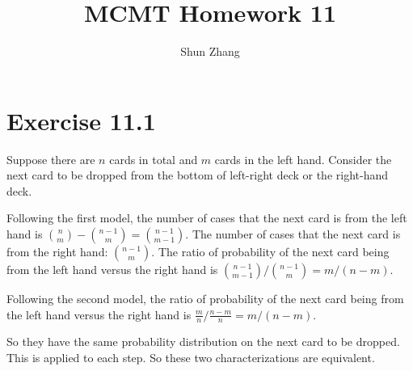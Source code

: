 \documentclass[10pt]{article}
\title{MCMT Homework 11}
\author{Shun Zhang}
\date{}
\begin{document}
\maketitle

\section*{Exercise 11.1}

Suppose there are $n$ cards in total and $m$ cards in the left hand. Consider
the next card to be dropped from the bottom of left-right deck or the right-hand
deck.

Following the first model, the number of cases that the next card is from the
left hand is ${n \choose m} - {n-1 \choose m} = {n-1 \choose m-1}$.
The number of cases that the next card is from the right hand: ${n-1 \choose
m}$.
The ratio of probability of the next card being from the left hand versus the
right hand is ${n-1 \choose m-1} / {n-1 \choose m} = m / (n - m)$.

Following the second model, the ratio of probability of the next card being from
the left hand versus the right hand is $\frac{m}{n} / \frac{n-m}{n} = m / (n -
m)$.

So they have the same probability distribution on the next card to be dropped.
This is applied to each step. So these two characterizations are equivalent.
\end{document}
